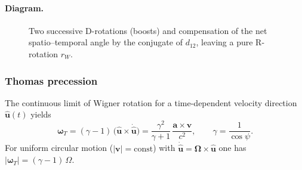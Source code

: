 \documentclass[11pt]{article}
\numberwithin{equation}{section}
\providecommand{\uhat}{\hat{\mathbf u}}
\begin{document}
\paragraph{Diagram.}
\begin{figure}[!ht]
\centering
{}
\caption{Two successive D-rotations (boosts) and compensation of the net spatio--temporal angle by the conjugate of $d_{12}$, leaving a pure R-rotation $r_W$.}
\label{fig:tikz-wigner-pullback}
\end{figure}

\subsubsection{Thomas precession}
\label{subsec:thomas}
The continuous limit of Wigner rotation for a time-dependent velocity direction $\uhat(t)$ yields
\begin{equation}
\boldsymbol{\omega}_T=(\gamma-1)\,\bigl(\uhat\times \dot{\uhat}\bigr)
=\frac{\gamma^2}{\gamma+1}\,\frac{\mathbf a\times \mathbf v}{c^2},\qquad
\gamma=\frac{1}{\cos\psi}.
\end{equation}
For uniform circular motion ($|\mathbf v|=\mathrm{const}$) with $\dot{\uhat}=\boldsymbol{\Omega}\times\uhat$ one has
$\lvert\boldsymbol{\omega}_T\rvert=(\gamma-1)\,\Omega$.
\end{document}
